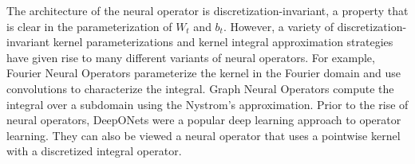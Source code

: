 \documentclass[12pt]{article}
\begin{document}
The architecture of the neural operator is discretization-invariant, a property that is clear in the parameterization of $W_t$ and $b_t$. However, a variety of discretization-invariant kernel parameterizations and kernel integral approximation strategies have given rise to many different variants of neural operators.  
For example, Fourier Neural Operators \autocite{li2020fourier} parameterize the kernel in the Fourier domain and use convolutions to characterize the integral. Graph Neural Operators \autocite{li2020multipole} compute the integral over a subdomain using the Nystrom's approximation. Prior to the rise of neural operators, DeepONets \autocite{lu2021learning} were a popular deep learning approach to operator learning. They can also be viewed a neural operator that uses a pointwise kernel with a discretized integral operator. 


\end{document}
